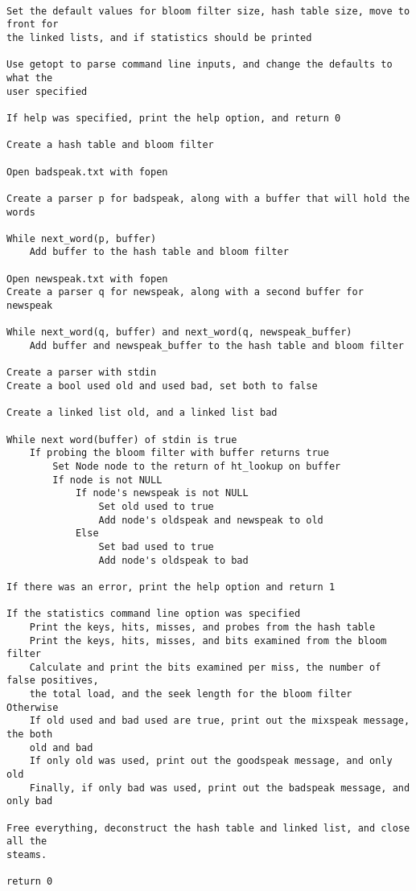 \documentclass[11pt]{article}
\begin{document}
\begin{verbatim}

Set the default values for bloom filter size, hash table size, move to front for
the linked lists, and if statistics should be printed

Use getopt to parse command line inputs, and change the defaults to what the
user specified

If help was specified, print the help option, and return 0

Create a hash table and bloom filter

Open badspeak.txt with fopen

Create a parser p for badspeak, along with a buffer that will hold the words

While next_word(p, buffer)
    Add buffer to the hash table and bloom filter

Open newspeak.txt with fopen
Create a parser q for newspeak, along with a second buffer for newspeak

While next_word(q, buffer) and next_word(q, newspeak_buffer)
    Add buffer and newspeak_buffer to the hash table and bloom filter

Create a parser with stdin
Create a bool used old and used bad, set both to false

Create a linked list old, and a linked list bad

While next word(buffer) of stdin is true
    If probing the bloom filter with buffer returns true
        Set Node node to the return of ht_lookup on buffer
        If node is not NULL
            If node's newspeak is not NULL
                Set old used to true
                Add node's oldspeak and newspeak to old
            Else
                Set bad used to true
                Add node's oldspeak to bad

If there was an error, print the help option and return 1

If the statistics command line option was specified
    Print the keys, hits, misses, and probes from the hash table
    Print the keys, hits, misses, and bits examined from the bloom filter
    Calculate and print the bits examined per miss, the number of false positives,
    the total load, and the seek length for the bloom filter
Otherwise
    If old used and bad used are true, print out the mixspeak message, the both
    old and bad
    If only old was used, print out the goodspeak message, and only old
    Finally, if only bad was used, print out the badspeak message, and only bad

Free everything, deconstruct the hash table and linked list, and close all the
steams.

return 0

\end{verbatim}
\end{document}
